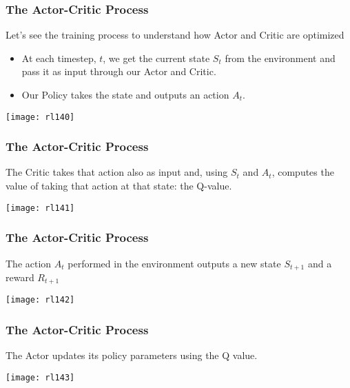 \begin{frame}[fragile]\frametitle{The Actor-Critic Process}
Let's see the training process to understand how Actor and Critic are optimized

\begin{itemize}
\item At each timestep, $t$, we get the current state $S_t$ from the environment and pass it as input through our Actor and Critic.
\item Our Policy takes the state and outputs an action $A_t$.
\end{itemize}

\begin{center}
\texttt{[image: rl140]}
\end{center}
\end{frame}

\begin{frame}[fragile]\frametitle{The Actor-Critic Process}
The Critic takes that action also as input and, using $S_t$ and $A_t$, computes the value of taking that action at that state: the Q-value.
\begin{center}
\texttt{[image: rl141]}
\end{center}
\end{frame}

\begin{frame}[fragile]\frametitle{The Actor-Critic Process}

The action $A_t$ performed in the environment outputs a new state $S_{t+1}$ and a reward $R_{t+1}$
	
\begin{center}
\texttt{[image: rl142]}
\end{center}
\end{frame}

\begin{frame}[fragile]\frametitle{The Actor-Critic Process}

The Actor updates its policy parameters using the Q value.
	
\begin{center}
\texttt{[image: rl143]}
\end{center}
\end{frame}

